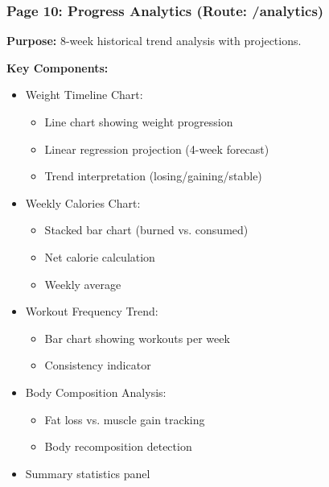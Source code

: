 \documentclass[12pt,a4paper]{article}
\begin{document}
\vspace{0.5cm}
\noindent{}
\vspace{1cm}


\subsubsection*{Page 10: Progress Analytics (Route: /analytics)}

\textbf{Purpose:} 8-week historical trend analysis with projections.

\textbf{Key Components:}
\begin{itemize}[noitemsep, topsep=2pt]
  \item Weight Timeline Chart:
    \begin{itemize}[noitemsep, topsep=0pt]
      \item Line chart showing weight progression
      \item Linear regression projection (4-week forecast)
      \item Trend interpretation (losing/gaining/stable)
    \end{itemize}
  \item Weekly Calories Chart:
    \begin{itemize}[noitemsep, topsep=0pt]
      \item Stacked bar chart (burned vs. consumed)
      \item Net calorie calculation
      \item Weekly average
    \end{itemize}
  \item Workout Frequency Trend:
    \begin{itemize}[noitemsep, topsep=0pt]
      \item Bar chart showing workouts per week
      \item Consistency indicator
    \end{itemize}
  \item Body Composition Analysis:
    \begin{itemize}[noitemsep, topsep=0pt]
      \item Fat loss vs. muscle gain tracking
      \item Body recomposition detection
    \end{itemize}
  \item Summary statistics panel
\end{itemize}
\end{document}
